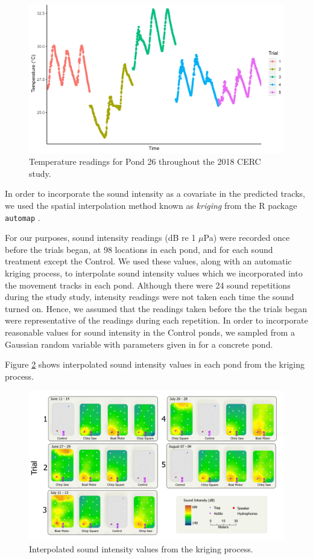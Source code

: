 \documentclass[12pt]{article}
\begin{document}
	\begin{figure}
		\includegraphics[width=\textwidth]{pond_26_temp.png}
		\caption{Temperature readings for Pond 26 throughout the 2018 CERC study.}
		\label{img:temperature}
	\end{figure}
	
	In order to incorporate the sound intensity as a covariate in the predicted tracks, we used the spatial interpolation method known as \emph{kriging} from the R package \texttt{automap} \cite{Hiemstra2008}. 
	
	For our purposes, sound intensity readings (dB re 1 $\mu$Pa) were recorded once before the trials began, at 98 locations in each pond, and for each sound treatment except the Control. We used these values, along with an automatic kriging process, to interpolate sound intensity values which we incorporated into the movement tracks in each pond. Although there were 24 sound repetitions during the study study, intensity readings were not taken each time the sound turned on. Hence, we assumed that the readings taken before the the trials began were representative of the readings during each repetition. In order to incorporate reasonable values for sound intensity in the Control ponds, we sampled from a Gaussian random variable with parameters given in \cite{Wysocki2007} for a concrete pond.
	
	Figure \ref{img:intensities} shows interpolated sound intensity values in each pond from the kriging process.
	
	\begin{figure}[H]
		\includegraphics[width=\textwidth]{intensities.png}
		\caption{Interpolated sound intensity values from the kriging process.}
		\label{img:intensities}
	\end{figure}		
	
\end{document}
